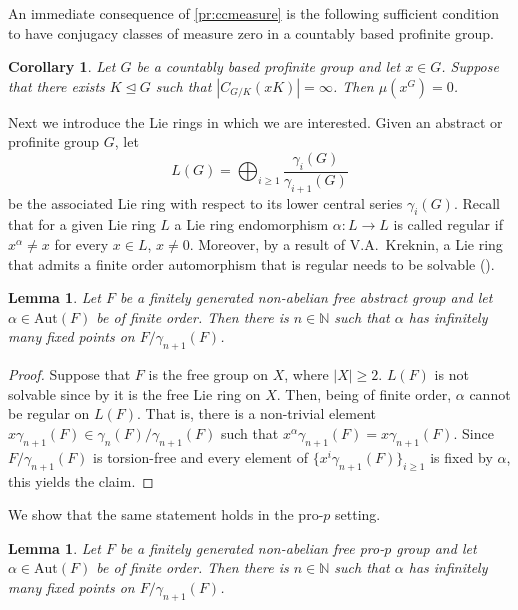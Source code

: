 \documentclass[a4paper,10pt]{amsart}
\theoremstyle{plain}
\newtheorem{corollary}[thm]{Corollary}
\newtheorem{lemma}[thm]{Lemma}
\theoremstyle{definition}
\newcommand{\bbN}{\mathbb{N}}
\numberwithin{equation}{section}
\begin{document}
	An immediate consequence of \cref{pr:ccmeasure} is the following sufficient condition to have conjugacy classes of measure zero in a countably based profinite group.
	\begin{corollary}\label{criterium}
		Let $G$ be a countably based profinite group and let $x\in G$. Suppose that there exists $K\unlhd G$ such that $|C_{G/K}(xK)|=\infty$. Then $\mu(x^G)=0$.
	\end{corollary}

	Next we introduce the Lie rings in which we are interested. Given an abstract or profinite group $G$, let \[ L(G)=\bigoplus_{i\geq 1}\frac{\gamma_i(G)}{\gamma_{i+1}(G)}\] be the associated Lie ring with respect to its lower central series $\gamma_i(G)$. Recall that for a given  Lie ring $L$ a Lie ring endomorphism $\alpha\colon L\to L$ is called regular if $x^\alpha\neq x$ for every $x\in L$, $x\neq 0$. Moreover, 
    by a result of V.A.~Kreknin,
    a Lie ring that admits a finite order automorphism that is regular needs to be solvable (\cite[Theorem 4.3.1]{Khu93}).
	\begin{lemma}\label{lm:abstract}
		Let $F$ be a finitely generated non-abelian free abstract group and let $\alpha\in\mathrm{Aut}(F)$ be 
        of finite order. Then there is $n\in\bbN$ such that $\alpha$ has infinitely many fixed points on $F/\gamma_{n+1}(F)$.
	\end{lemma}
	\begin{proof}
		Suppose that $F$ is the free group on $X$, where $|X|\geq2$. $L(F)$ is not solvable since by \cite[Theorem 4.6.1]{Ser65} it is the free Lie ring on $X$. Then, being of finite order, $\alpha$ cannot be regular on $L(F)$. That is, there is a non-trivial element $x\gamma_{n+1}(F)\in\gamma_{n}(F)/\gamma_{n+1}(F)$ such that $x^\alpha\gamma_{n+1}(F)=x\gamma_{n+1}(F)$. Since $F/\gamma_{n+1}(F)$ is torsion-free and every element of $\{x^i\gamma_{n+1}(F)\}_{i\geq1}$ is fixed by $\alpha$, 
        this yields the claim.
      \end{proof}
	 We show that the same statement holds in the pro-$p$ setting. 
	\begin{lemma}\label{pr:adaptation}
		Let $F$ be a finitely generated non-abelian free pro-$p$ group and let $\alpha\in\mathrm{Aut}(F)$ be of finite order. Then there is $n\in\bbN$ such that $\alpha$ has infinitely many fixed points on $F/\gamma_{n+1}(F)$.
	\end{lemma}
\end{document}
